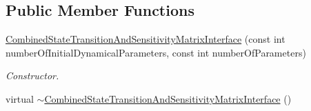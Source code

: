 \subsection*{Public Member Functions}
\begin{DoxyCompactItemize}
\item 
\hyperlink{classtudat_1_1propagators_1_1CombinedStateTransitionAndSensitivityMatrixInterface_a9b6e7cdf19757be3d53adac83058583a}{Combined\+State\+Transition\+And\+Sensitivity\+Matrix\+Interface} (const int number\+Of\+Initial\+Dynamical\+Parameters, const int number\+Of\+Parameters)
\begin{DoxyCompactList}\small\item\em Constructor. \end{DoxyCompactList}\item 
virtual \hyperlink{classtudat_1_1propagators_1_1CombinedStateTransitionAndSensitivityMatrixInterface_a6d9636366ea19edc8271d148b1d36d8f}{$\sim$\+Combined\+State\+Transition\+And\+Sensitivity\+Matrix\+Interface} ()\hypertarget{classtudat_1_1propagators_1_1CombinedStateTransitionAndSensitivityMatrixInterface_a6d9636366ea19edc8271d148b1d36d8f}{}\label{classtudat_1_1propagators_1_1CombinedStateTransitionAndSensitivityMatrixInterface_a6d9636366ea19edc8271d148b1d36d8f}


\end{DoxyCompactItemize}

